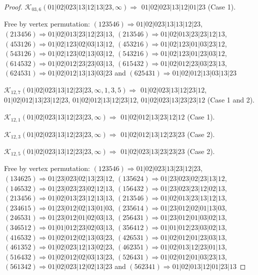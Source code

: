 \documentclass[12pt]{article}
\theoremstyle{plain}
\theoremstyle{definition}
\theoremstyle{remark}
\newcommand{\fancy}[1]{\mathcal{#1}}
\def\K{\fancy{K}}
\begin{document}
\begin{proof}
	$\K_{03,6}(01|02|023|13|12|13|23,\infty)\Rightarrow $ $01|02|023|13|12|01|23$ (Case 1).
	
	
	
	Free by vertex permutation: $(1 2 3 5 4 6)\Rightarrow 01|02|023|13|13|12|23$, $(2 1 3 4 5 6)\Rightarrow 01|02|013|23|12|23|13$, $(2 1 3 5 4 6)\Rightarrow 01|02|013|23|23|12|13$, $(4 5 3 1 2 6)\Rightarrow 01|02|123|02|03|13|12$, $(4 5 3 2 1 6)\Rightarrow 01|02|123|01|03|23|12$, $(5 4 3 1 2 6)\Rightarrow 01|02|123|02|13|03|12$, $(5 4 3 2 1 6)\Rightarrow 01|02|123|01|23|03|12$, $(6 1 4 5 3 2)\Rightarrow 01|02|012|23|23|03|13$, $(6 1 5 4 3 2)\Rightarrow 01|02|012|23|03|23|13$, $(6 2 4 5 3 1)\Rightarrow 01|02|012|13|13|03|23$ and $(6 2 5 4 3 1)\Rightarrow 01|02|012|13|03|13|23$
	
	
	
	\bigskip
	
	$\K_{12,7}(01|02|023|13|12|23|23,\infty,1, 3, 5)\Rightarrow $ $01|02|023|13|12|23|12$, $01|02|012|13|23|12|23$, $01|02|012|13|12|23|12$, $01|02|023|13|23|23|12$ (Case 1 and 2).
	
	$\K_{12,1}(01|02|023|13|12|23|23,\infty)\Rightarrow $ $01|02|012|13|23|12|12$ (Case 1).
	
	$\K_{12,3}(01|02|023|13|12|23|23,\infty)\Rightarrow $ $01|02|012|13|12|23|23$ (Case 2).
	
	$\K_{12,5}(01|02|023|13|12|23|23,\infty)\Rightarrow $ $01|02|023|13|23|23|23$ (Case 2).
	
	
	
	Free by vertex permutation: $(1 2 3 5 4 6)\Rightarrow 01|02|023|13|23|12|23$, $(1 3 4 6 2 5)\Rightarrow 01|23|023|02|13|23|12$, $(1 3 5 6 2 4)\Rightarrow 01|23|023|02|23|13|12$, $(1 4 6 5 3 2)\Rightarrow 01|23|023|23|02|12|13$, $(1 5 6 4 3 2)\Rightarrow 01|23|023|23|12|02|13$, $(2 1 3 4 5 6)\Rightarrow 01|02|013|23|12|13|13$, $(2 1 3 5 4 6)\Rightarrow 01|02|013|23|13|12|13$, $(2 3 4 6 1 5)\Rightarrow 01|23|012|02|13|01|03$, $(2 3 5 6 1 4)\Rightarrow 01|23|012|02|01|13|03$, $(2 4 6 5 3 1)\Rightarrow 01|23|012|01|02|03|13$, $(2 5 6 4 3 1)\Rightarrow 01|23|012|01|03|02|13$, $(3 4 6 5 1 2)\Rightarrow 01|01|012|23|02|03|13$, $(3 5 6 4 1 2)\Rightarrow 01|01|012|23|03|02|13$, $(4 1 6 5 3 2)\Rightarrow 01|02|012|02|13|03|23$, $(4 2 6 5 3 1)\Rightarrow 01|02|012|01|23|03|13$, $(4 6 1 3 5 2)\Rightarrow 01|02|023|12|13|02|23$, $(4 6 2 3 5 1)\Rightarrow 01|02|013|12|23|01|13$, $(5 1 6 4 3 2)\Rightarrow 01|02|012|02|03|13|23$, $(5 2 6 4 3 1)\Rightarrow 01|02|012|01|03|23|13$, $(5 6 1 3 4 2)\Rightarrow 01|02|023|12|02|13|23$ and $(5 6 2 3 4 1)\Rightarrow 01|02|013|12|01|23|13$
	

\end{proof}
\end{document}

